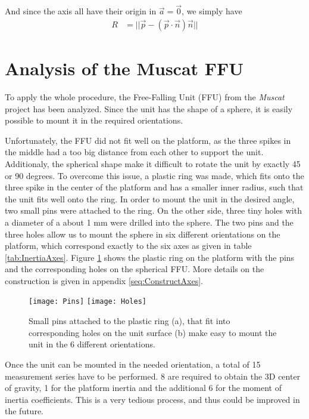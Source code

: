 \documentclass[journal]{IEEEtran}
\begin{document}
And since the axis all have their origin in $\vec{a} = \vec{0}$, we simply have
\begin{align}
	R & = || \vec{p} - (\vec{p} \cdot \vec{n}) \vec{n} ||
\end{align}

\section{Analysis of the Muscat FFU}

To apply the whole procedure, the Free-Falling Unit (FFU) from the \emph{Muscat} project has been analyzed.
Since the unit has the shape of a sphere, it is easily possible to mount it in the required orientations. 

Unfortunately, the FFU did not fit well on the platform, as the three spikes in the middle had a too big distance from each other to support the unit.
Additionaly, the spherical shape make it difficult to rotate the unit by exactly 45 or 90 degrees.
To overcome this issue, a plastic ring was made, which fits onto the three spike in the center of the platform and has a smaller inner radius, such that the unit fits well onto the ring.
In order to mount the unit in the desired angle, two small pins were attached to the ring. On the other side, three tiny holes with a diameter of a about 1 mm were drilled into the sphere. The two pins and the three holes allow us to mount the sphere in six different orientations on the platform, which correspond exactly to the six axes as given in table \ref{tab:InertiaAxes}.
Figure \ref{fig:PinsHoles} shows the plastic ring on the platform with the pins and the corresponding holes on the spherical FFU.
More details on the construction is given in appendix \ref{seq:ConstructAxes}.

\begin{figure}
	\centering
	\texttt{[image: Pins]}
	\texttt{[image: Holes]}
	\caption{Small pins attached to the plastic ring (a), that fit into corresponding holes on the unit surface (b) make easy to mount the unit in the 6 different orientations.}
	\label{fig:PinsHoles}
\end{figure}

Once the unit can be mounted in the needed orientation, a total of 15 measurement series have to be performed. 8 are required to obtain the 3D center of gravity, 1 for the platform inertia and the additional 6 for the moment of inertia coefficients.
This is a very tedious process, and thus could be improved in the future.
\end{document}
